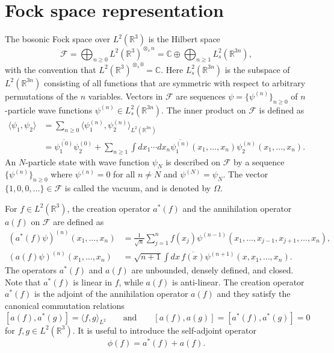 \documentclass[11pt,a4paper]{scrartcl}
\newcommand{\R}{\mathds{R}}
\begin{document}
\tableofcontents


\newpage


\section{Fock space representation}


The bosonic Fock space over $L^2(\R^3)$ is the Hilbert space
\[
  \mathcal{F} = \bigoplus_{n \ge 0} L^2(\R^3)^{\otimes_s n} = \mathds{C}
  \oplus \bigoplus_{n \ge 1} L^2_s(\R^{3n}),
\]
with the convention that $L^2(\R^3)^{\otimes_s 0} = \mathds{C}$. Here
$L^2_s(\R^{3n})$ is the subspace of $L^2(\R^{3n})$ consisting of all functions
that are symmetric with respect to arbitrary permutations of the $n$
variables. Vectors in $\mathcal{F}$ are sequences $\psi = \{ \psi^{(n)} \}_{n
\ge 0}$ of $n$-particle wave functions $\psi^{(n)} \in L^2_s(\R^{3n})$. The
inner product on $\mathcal{F}$ is defined as
\begin{align*}
  \langle \psi_1, \psi_2 \rangle & = \sum_{n \ge 0} \langle \psi_1^{(n)},
  \psi_2^{(n)} \rangle_{L^2(\R^{3n})} \\
  & = \overline{\psi_1^{(0)}} \psi_2^{(0)} + \sum_{n \ge 1} \int dx_1 \cdots
  dx_n \overline{\psi_1^{(n)}}(x_1, \dots, x_n) \psi_2^{(n)}(x_1, \dots, x_n).
\end{align*}
An $N$-particle state with wave function $\psi_N$ is described on
$\mathcal{F}$ by a sequence $\{ \psi^{(n)} \}_{n \ge 0}$ where $\psi^{(n)} =
0$ for all $n \neq N$ and $\psi^{(N)} = \psi_N$. The vector $\{ 1, 0, 0, \dots
\} \in \mathcal{F}$ is called the vacuum, and is denoted by $\Omega$.


For $f \in L^2(\R^3)$, the creation operator $a^*(f)$ and the annihilation
operator $a(f)$ on $\mathcal{F}$ are defined as
\[
  \begin{split}
    (a^*(f) \psi)^{(n)}(x_1, \dots, x_n) & = \frac{1}{\sqrt{n}} \sum_{j=1}^n
    f(x_j) \psi^{(n-1)}(x_1, \dots, x_{j-1}, x_{j+1}, \dots, x_n), \\
    (a(f) \psi)^{(n)}(x_1, \dots, x_n) & = \sqrt{n+1} \int dx \,
    \overline{f(x)} \psi^{(n+1)}(x, x_1, \dots, x_n).
  \end{split}
\]
The operators $a^*(f)$ and $a(f)$ are unbounded, densely defined, and closed.
Note that $a^*(f)$ is linear in $f$, while $a(f)$ is anti-linear. The creation
operator $a^*(f)$ is the adjoint of the annihilation operator $a(f)$ and they
satisfy the canonical commutation relations
\[
  [a(f), a^*(g)] = \langle f, g \rangle_{L^2} \qquad \text{and} \qquad [a(f),
  a(g)] = [a^*(f), a^*(g)] = 0
\]
for $f,g \in L^2(\R^3)$. It is useful to introduce the self-adjoint operator
\[
  \phi(f) = a^*(f) + a(f).
\]
\end{document}
